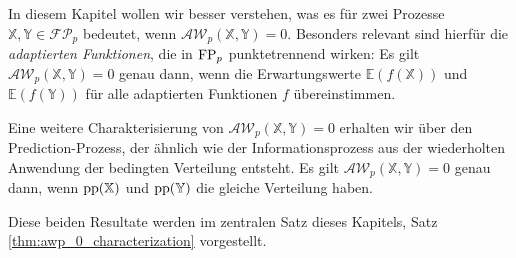 In diesem Kapitel wollen wir besser verstehen, was es für zwei Prozesse $\mathbb{X,Y} \in \mathcal{FP}_p$ bedeutet, wenn $\mathcal{AW}_p(\mathbb{X,Y}) = 0$. Besonders relevant sind hierfür die \emph{adaptierten Funktionen}, die in $\operatorname{FP}_p$ punktetrennend wirken: Es gilt $\mathcal{AW}_p(\mathbb{X,Y})=0$ genau dann, wenn die Erwartungswerte $\mathbb{E}(f(\mathbb{X}))$ und $\mathbb{E}(f(\mathbb{Y}))$ für alle adaptierten Funktionen $f$ übereinstimmen. 

Eine weitere Charakterisierung von $\mathcal{AW}_p(\mathbb{X,Y})=0$ erhalten wir über den \\ 
Prediction-Prozess, der ähnlich wie der Informationsprozess aus der wiederholten Anwendung der bedingten Verteilung entsteht. Es gilt $\mathcal{AW}_p(\mathbb{X,Y})=0$ genau dann, wenn $\operatorname{pp}(\mathbb{X})$ und $\operatorname{pp}(\mathbb{Y})$ die gleiche Verteilung haben.

Diese beiden Resultate werden im zentralen Satz dieses Kapitels, Satz \ref{thm:awp_0_characterization} vorgestellt.


